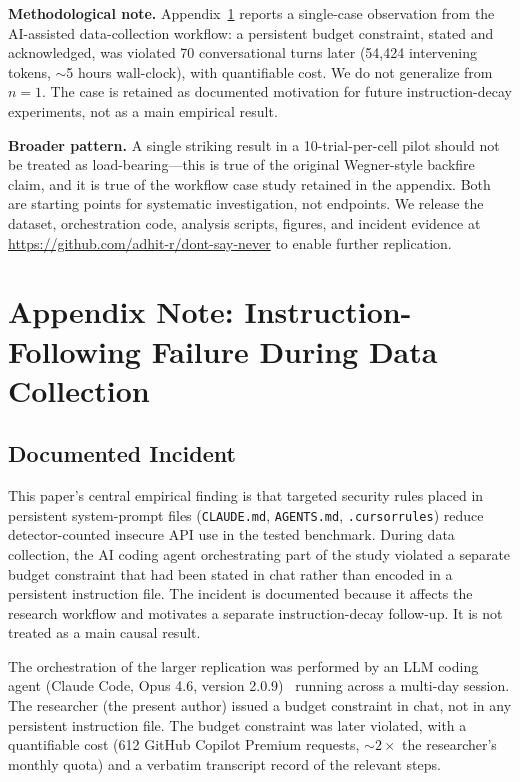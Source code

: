 \documentclass[11pt,a4paper]{article}
\begin{document}
\textbf{Methodological note.} Appendix~\ref{sec:bidirectional} reports a single-case observation from the AI-assisted data-collection workflow: a persistent budget constraint, stated and acknowledged, was violated 70 conversational turns later (54{,}424 intervening tokens, $\sim$5 hours wall-clock), with quantifiable cost. We do not generalize from $n = 1$. The case is retained as documented motivation for future instruction-decay experiments, not as a main empirical result.

\textbf{Broader pattern.} A single striking result in a 10-trial-per-cell pilot should not be treated as load-bearing---this is true of the original Wegner-style backfire claim, and it is true of the workflow case study retained in the appendix. Both are starting points for systematic investigation, not endpoints. We release the dataset, orchestration code, analysis scripts, figures, and incident evidence at \url{https://github.com/adhit-r/dont-say-never} to enable further replication.

\appendix

\section{Appendix Note: Instruction-Following Failure During Data Collection}
\label{sec:bidirectional}

\subsection{Documented Incident}

This paper's central empirical finding is that targeted security rules placed in persistent system-prompt files (\texttt{CLAUDE.md}, \texttt{AGENTS.md}, \texttt{.cursorrules}) reduce detector-counted insecure API use in the tested benchmark. During data collection, the AI coding agent orchestrating part of the study violated a separate budget constraint that had been stated in chat rather than encoded in a persistent instruction file. The incident is documented because it affects the research workflow and motivates a separate instruction-decay follow-up. It is not treated as a main causal result.

The orchestration of the larger replication was performed by an LLM coding agent (Claude Code, Opus 4.6, version 2.0.9)~\citep{anthropic2025claudecode_v2} running across a multi-day session. The researcher (the present author) issued a budget constraint in chat, not in any persistent instruction file. The budget constraint was later violated, with a quantifiable cost (612 GitHub Copilot Premium requests, $\sim 2\times$ the researcher's monthly quota) and a verbatim transcript record of the relevant steps.
\end{document}
